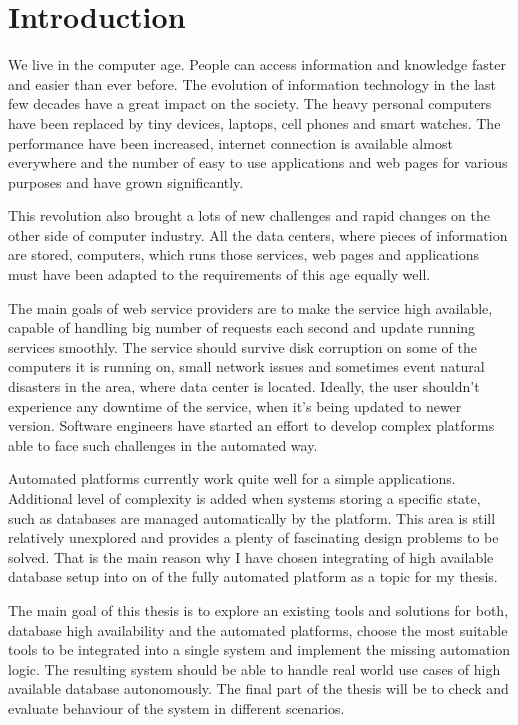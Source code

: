 \documentclass[
  digital, %
  twoside, %
  table,   %
  lof,     %
  lot,     %
]{fithesis3}
\begin{document}
\chapter*{Introduction}

We live in the computer age. People can access information and knowledge faster and easier than ever before. The evolution of information technology in the last few decades have a great impact on the society. The heavy personal computers have been replaced by tiny devices, laptops, cell phones and smart watches. The performance have been increased, internet connection is available almost everywhere and the number of easy to use applications and web pages for various purposes and have grown significantly.

This revolution also brought a lots of new challenges and rapid changes on the other side of computer industry. All the data centers, where pieces of information are stored, computers, which runs those services, web pages and applications must have been adapted to the requirements of this age equally well.

The main goals of web service providers are to make the service high available, capable of handling big number of requests each second and update running services smoothly. The service should survive disk corruption on some of the computers it is running on, small network issues and sometimes event natural disasters in the area, where data center is located. Ideally, the user shouldn't experience any downtime of the service, when it's being updated to newer version. Software engineers have started an effort to develop complex platforms able to face such challenges in the automated way.

Automated platforms currently work quite well for a simple applications. Additional level of complexity is added when systems storing a specific state, such as databases are managed automatically by the platform. This area is still relatively unexplored and provides a plenty of fascinating design problems to be solved. That is the main reason why I have chosen integrating of high available database setup into on of the fully automated platform as a topic for my thesis.

The main goal of this thesis is to explore an existing tools and solutions for both, database high availability and the automated platforms, choose the most suitable tools to be integrated into a single system and implement the missing automation logic. The resulting system should be able to handle real world use cases of high available database autonomously. The final part of the thesis will be to check and evaluate behaviour of the system in different scenarios.
\end{document}
